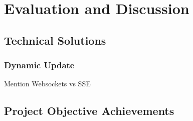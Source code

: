 \chapter{Evaluation and Discussion}

\section{Technical Solutions}
\subsection{Dynamic Update}
Mention Websockets vs SSE

\section{Project Objective Achievements}
